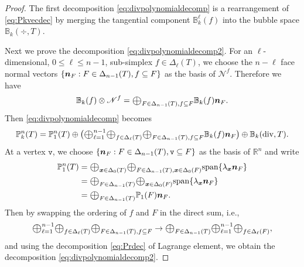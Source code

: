 \documentclass[mathpazo]{cicp}
\newcommand{\Oplus}{\ensuremath{\vcenter{\hbox{\scalebox{1.5}{$\oplus$}}}}}
\begin{document}
\begin{proof}
The first decomposition \eqref{eq:divpolynomialdecomp} is a rearrangement of \eqref{eq:Pkvecdec} by merging the tangential component $\mathbb B_{k}^{\ell}( f) $ into the bubble space $\mathbb B_k(\div, T)$. 

Next we prove the decomposition \eqref{eq:divpolynomialdecomp2}.
%
For an $\ell$-dimensional, $0\leq \ell\leq n-1$, sub-simplex $f\in\Delta_{\ell}(T)$, we choose the $n-\ell$ face normal vectors $\{\boldsymbol n_{F}: F\in \Delta_{n-1}(T), f\subseteq F\}$ as the basis of $\mathscr{N}^f$. Therefore  we have
$$
\mathbb B_{k}( f) \otimes \mathscr{N}^f =\Oplus_{F\in \Delta_{n-1}(T), f\subseteq F}\mathbb B_{k}( f)\bs n_F.
$$
Then \eqref{eq:divpolynomialdecomp} becomes
\begin{equation*}%
\mathbb P_k^n(T) = \mathbb P_1^n(T) \oplus \big(\Oplus_{\ell=1}^{n-1}\Oplus_{f\in\Delta_{\ell}(T)}\Oplus_{F\in \Delta_{n-1}(T), f\subseteq F}\mathbb B_{k}( f)\bs n_F\big)\oplus \mathbb B_k(\div, T).
\end{equation*}
At a vertex $\texttt{v}$, we choose $\{\boldsymbol n_{F}: F\in \Delta_{n-1}(T), \texttt{v}\subseteq F\}$ as the basis of $\mathbb R^n$ and write 
\begin{align*}  
\mathbb P_1^n(T) 
&= \Oplus_{{\bs x}\in \Delta_{0}(T)}\Oplus_{F\in\Delta_{n-1}(T), {\bs x}\in\Delta_0(F)}{\rm span}\{ \lambda_{{\bs x}}\bs n_F\} \\
&= \Oplus_{F\in\Delta_{n-1}(T)}\Oplus_{{\bs x}\in \Delta_{0}(F)}{\rm span}\{ \lambda_{{\bs x}}\bs n_F\}\\
&= \Oplus_{F\in\Delta_{n-1}(T)} \mathbb P_1(F)\bs n_F.
\end{align*}
Then by swapping the ordering of $f$ and $F$ in the direct sum, i.e.,
$$
\Oplus_{\ell=1}^{n-1}\Oplus_{f\in\Delta_{\ell}(T)}\Oplus_{F\in \Delta_{n-1}(T), f\subseteq F} \to \Oplus_{F\in \Delta_{n-1}(T)}\Oplus_{\ell=1}^{n-1}\Oplus_{f\in\Delta_{\ell}(F)},
$$
and using the decomposition \eqref{eq:Prdec} of Lagrange element, we obtain the decomposition \eqref{eq:divpolynomialdecomp2}.
%

\end{proof}
\end{document}
